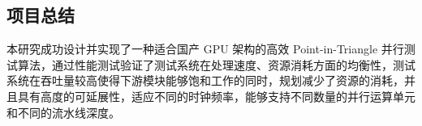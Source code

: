 \subsection{项目总结}

本研究成功设计并实现了一种适合国产 GPU 架构的高效 Point-in-Triangle 并行测试算法，通过性能测试验证了测试系统在处理速度、资源消耗方面的均衡性，测试系统在吞吐量较高使得下游模块能够饱和工作的同时，规划减少了资源的消耗，并且具有高度的可延展性，适应不同的时钟频率，能够支持不同数量的并行运算单元和不同的流水线深度。



